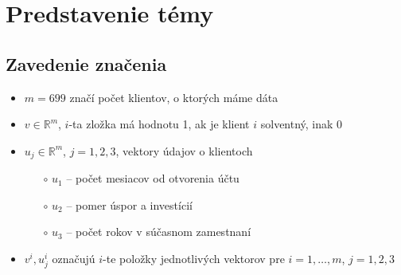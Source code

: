 \documentclass[report.tex]{subfiles}
\begin{document}
	
\section{Predstavenie témy}	

\subsection{Zavedenie značenia}

\begin{itemize}
	\item $m = 699$ značí počet klientov, o ktorých máme dáta
	\item $v \in \mathbb{R}^m$, $i$-ta zložka má hodnotu 1, ak je klient $i$ solventný, inak 0
	\item $u_j \in \mathbb{R}^m$, $j=1,2,3$, vektory údajov o klientoch
	\begin{itemize}
		\item[$\circ$] $u_1$ -- počet mesiacov od otvorenia účtu
		\item[$\circ$] $u_2$ -- pomer úspor a investícií
		\item[$\circ$] $u_3$ -- počet rokov v súčasnom zamestnaní
	\end{itemize}
	\item $v^i,u_j^i$ označujú $i$-te položky jednotlivých vektorov pre $i=1,\dots,m$, $j=1,2,3$
\end{itemize}
	
\end{document}
